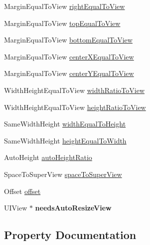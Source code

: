 \begin{DoxyCompactItemize}
\item 
Margin\+Equal\+To\+View \mbox{\hyperlink{interface_s_d_auto_layout_model_a8e28e9c9d0e711e91baecdedd2d51687}{right\+Equal\+To\+View}}
\item 
Margin\+Equal\+To\+View \mbox{\hyperlink{interface_s_d_auto_layout_model_a5201405abcafc0c76d04afe7552ffb92}{top\+Equal\+To\+View}}
\item 
Margin\+Equal\+To\+View \mbox{\hyperlink{interface_s_d_auto_layout_model_a3fa480b9313cfa007d7ed532933c9012}{bottom\+Equal\+To\+View}}
\item 
Margin\+Equal\+To\+View \mbox{\hyperlink{interface_s_d_auto_layout_model_a48eb7bc0400b3af295f3b6f89c0b73b5}{center\+X\+Equal\+To\+View}}
\item 
Margin\+Equal\+To\+View \mbox{\hyperlink{interface_s_d_auto_layout_model_a93ed4096e3831efd236092e6fcb0eb99}{center\+Y\+Equal\+To\+View}}
\item 
Width\+Height\+Equal\+To\+View \mbox{\hyperlink{interface_s_d_auto_layout_model_a9cc3170040975600f05811d2bc350240}{width\+Ratio\+To\+View}}
\item 
Width\+Height\+Equal\+To\+View \mbox{\hyperlink{interface_s_d_auto_layout_model_a281b26380363beff8b1dc04696ac5803}{height\+Ratio\+To\+View}}
\item 
Same\+Width\+Height \mbox{\hyperlink{interface_s_d_auto_layout_model_adcf1e1087b24e152f7c6fa741f304f98}{width\+Equal\+To\+Height}}
\item 
Same\+Width\+Height \mbox{\hyperlink{interface_s_d_auto_layout_model_a6dcc468b999cb73939ba82e2a13cf372}{height\+Equal\+To\+Width}}
\item 
Auto\+Height \mbox{\hyperlink{interface_s_d_auto_layout_model_a590e87d7e14ea50fc697f78b886af4dc}{auto\+Height\+Ratio}}
\item 
Space\+To\+Super\+View \mbox{\hyperlink{interface_s_d_auto_layout_model_ae06839de94538fe649f519d5452d6dc2}{space\+To\+Super\+View}}
\item 
Offset \mbox{\hyperlink{interface_s_d_auto_layout_model_a564039c67921704a9c118f2ac0d99aa5}{offset}}
\item 
\mbox{\label{interface_s_d_auto_layout_model_a99d79a4416f954e94ffbb03e715811ba}} 
U\+I\+View $\ast$ {\bfseries needs\+Auto\+Resize\+View}
\end{DoxyCompactItemize}


\subsection{Property Documentation}
\mbox{\label{interface_s_d_auto_layout_model_a590e87d7e14ea50fc697f78b886af4dc}} 
